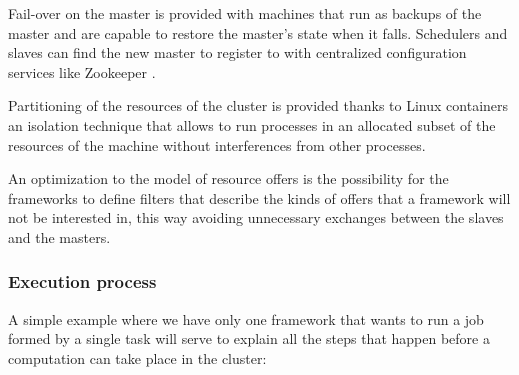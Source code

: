 \documentclass{svjour3}                     %
\begin{document}
Fail-over on the master is provided with machines that run as backups of the master and
are capable to restore the master's state when it falls. Schedulers and slaves can find
the new master to register to with centralized configuration services like Zookeeper \cite{_apache_????}.

Partitioning of the resources of the cluster is provided thanks to Linux containers \cite{_linux_????}
an isolation technique that allows to run processes in an allocated subset of the 
resources of the machine without interferences from other processes. 

An optimization to the model of resource offers is the possibility for the frameworks
to define filters that describe the kinds of offers that a framework will not be interested
in, this way avoiding unnecessary exchanges between the slaves and the masters.

\subsubsection{Execution process}

A simple example where we have only one framework that wants to run a 
job formed by a single task will serve to explain all the steps that happen
before a computation can take place in the cluster:
\end{document}
